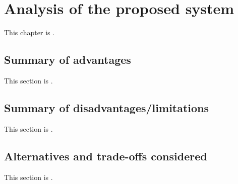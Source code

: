 
\chapter{Analysis of the proposed system}
\label{loc:Analysis of the proposed system}
% 

This chapter is \TBD.

\section{Summary of advantages}
\label{loc:Summary of advantages}
% 

This section is \TBD.


\section{Summary of disadvantages/limitations}
\label{loc:Summary of disadvantages/limitations}
% 

This section is \TBD.


\section{Alternatives and trade-offs considered}
\label{loc:Alternatives and trade-offs considered}
% 

This section is \TBD.
